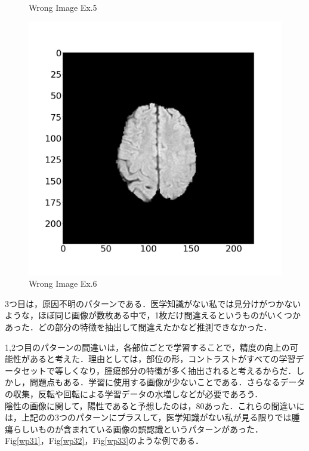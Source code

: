 \documentclass[11pt,a4j]{jarticle}
\begin{document}
\begin{figure}[ht]
\begin{minipage}{0.32\hsize}
		\vspace{-1cm}
		\renewcommand{\figurename}{Fig}
		\caption{Wrong Image Ex.5}
		\label{wp22}
	\end{minipage}
	\begin{minipage}{0.32\hsize}
		\centering
		\includegraphics[width=\linewidth]{../2_MedicalImageClassification/Dataset/2006.jpg}
		\vspace{-1cm}
		\renewcommand{\figurename}{Fig}
		\caption{Wrong Image Ex.6}
		\label{wp23}
	\end{minipage}
\end{figure}

3つ目は，原因不明のパターンである．医学知識がない私では見分けがつかないような，ほぼ同じ画像が数枚ある中で，1枚だけ間違えるというものがいくつかあった．どの部分の特徴を抽出して間違えたかなど推測できなかった．

1,2つ目のパターンの間違いは，各部位ごとで学習することで，精度の向上の可能性があると考えた．理由としては，部位の形，コントラストがすべての学習データセットで等しくなり，腫瘍部分の特徴が多く抽出されると考えるからだ．しかし，問題点もある．学習に使用する画像が少ないことである．さらなるデータの収集，反転や回転による学習データの水増しなどが必要であろう．\\

陰性の画像に関して，陽性であると予想したのは，80あった．これらの間違いには，上記のの3つのパターンにプラスして，医学知識がない私が見る限りでは腫瘍らしいものが含まれている画像の誤認識というパターンがあった．Fig\ref{wp31}，Fig\ref{wp32}，Fig\ref{wp33}のような例である．
\end{document}
